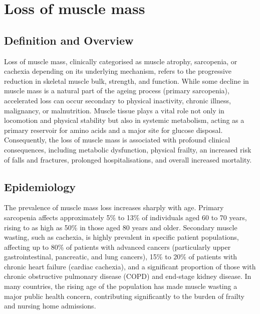 \chapter{Loss of muscle mass}

\section*{Definition and Overview}
Loss of muscle mass, clinically categorised as muscle atrophy, sarcopenia, or cachexia depending on its underlying mechanism, refers to the progressive reduction in skeletal muscle bulk, strength, and function. While some decline in muscle mass is a natural part of the ageing process (primary sarcopenia), accelerated loss can occur secondary to physical inactivity, chronic illness, malignancy, or malnutrition. Muscle tissue plays a vital role not only in locomotion and physical stability but also in systemic metabolism, acting as a primary reservoir for amino acids and a major site for glucose disposal. Consequently, the loss of muscle mass is associated with profound clinical consequences, including metabolic dysfunction, physical frailty, an increased risk of falls and fractures, prolonged hospitalisations, and overall increased mortality.

\section*{Epidemiology}
The prevalence of muscle mass loss increases sharply with age. Primary sarcopenia affects approximately 5\% to 13\% of individuals aged 60 to 70 years, rising to as high as 50\% in those aged 80 years and older. Secondary muscle wasting, such as cachexia, is highly prevalent in specific patient populations, affecting up to 80\% of patients with advanced cancers (particularly upper gastrointestinal, pancreatic, and lung cancers), 15\% to 20\% of patients with chronic heart failure (cardiac cachexia), and a significant proportion of those with chronic obstructive pulmonary disease (COPD) and end-stage kidney disease. In many countries, the rising age of the population has made muscle wasting a major public health concern, contributing significantly to the burden of frailty and nursing home admissions.

